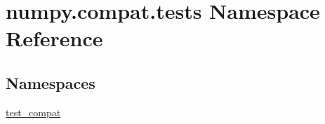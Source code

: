 \hypertarget{namespacenumpy_1_1compat_1_1tests}{}\section{numpy.\+compat.\+tests Namespace Reference}
\label{namespacenumpy_1_1compat_1_1tests}
\subsection*{Namespaces}
\begin{DoxyCompactItemize}
\item 
 \hyperlink{namespacenumpy_1_1compat_1_1tests_1_1test__compat}{test\+\_\+compat}
\end{DoxyCompactItemize}
